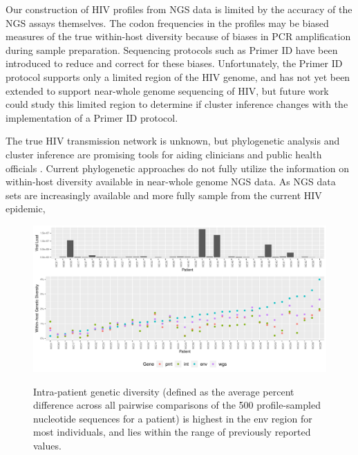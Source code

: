 \documentclass[letterpaper]{article}
\begin{document}
Our construction of HIV profiles from NGS data is limited by the accuracy of the NGS assays themselves. The codon frequencies in the profiles may be biased measures of the true within-host diversity because of biases in PCR amplification during sample preparation. Sequencing protocols such as Primer ID \parencite{jabara} have been introduced to reduce and correct for these biases. Unfortunately, the Primer ID protocol supports only a limited region of the HIV genome, and has not yet been extended to support near-whole genome sequencing of HIV, but future work could study this limited region to determine if cluster inference changes with the implementation of a Primer ID protocol.

The true HIV transmission network is unknown, but phylogenetic analysis and cluster inference are promising tools for aiding clinicians and public health officials \parencite{fauci}. Current phylogenetic approaches do not fully utilize the information on within-host diversity available in near-whole genome NGS data. As NGS data sets are increasingly available and more fully sample from the current HIV epidemic, 

\printbibliography

\begin{figure}[p!]
	\caption{Intra-patient genetic diversity (defined as the average percent difference across all pairwise comparisons of the 500 profile-sampled nucleotide sequences for a patient) is highest in the env region for most individuals, and lies within the range of previously reported values.}
	\centering
	\includegraphics[width=\linewidth]{Figure1}
	\label{fig1}
\end{figure}
\end{document}
